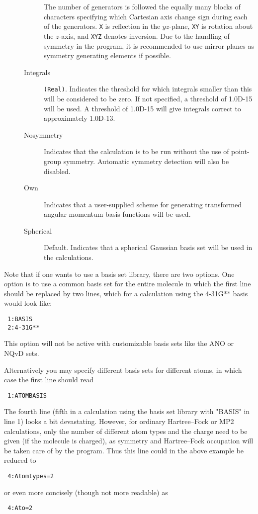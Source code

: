 \begin{description}
\begin{description}
The number of generators is followed the
equally many blocks of characters specifying which Cartesian axis
change sign during each of the generators. {\tt X}
is reflection
in the \mbox{$yz$-plane}, {\tt XY} is rotation about
the \mbox{$z$-axis},
and {\tt XYZ} denotes inversion. Due to the handling
of symmetry in
the program, it is recommended to use mirror planes as symmetry
generating elements if possible.
\item[Integrals] \verb|(Real)|. Indicates the threshold for which
  integrals smaller than this will be considered to be zero. If not
  specified, a threshold of 1.0D-15 will be used. A threshold
of 1.0D-15 will give integrals correct to approximately 1.0D-13.
\item[Nosymmetry] Indicates that the calculation is to be run without
  the use of point-group symmetry. Automatic symmetry detection will
  also be disabled.
\item[Own] Indicates that a user-supplied scheme for generating
  transformed angular momentum basis functions will be used.
\item[Spherical] Default. Indicates that a spherical Gaussian basis
  set will be used in the calculations.
\end{description}
\end{description}

Note that if one wants to use a basis set
library, there are two
options. One option is to use a common basis set for the entire
molecule in which the first line should be replaced by two lines,
which for a calculation using the 4-31G** basis would look like:
\begin{verbatim}
 1:BASIS
 2:4-31G**
\end{verbatim}
This option will not be active with customizable basis sets like the
ANO or NQvD sets.


Alternatively you may specify different basis sets for different
atoms, in which case the first line should read
\begin{verbatim}
 1:ATOMBASIS
\end{verbatim}

The fourth line (fifth in a calculation using the basis set library with "BASIS" in line 1)
looks a bit devastating. However, for ordinary
Hartree--Fock
or MP2 calculations, only the number of different atom types and the charge
need to be given (if the molecule is charged), as symmetry and
Hartree--Fock occupation
will be taken care of by the program. Thus
this line could in the above example be reduced to
\begin{verbatim}
 4:Atomtypes=2
\end{verbatim}
or even more concisely (though not more readable) as
\begin{verbatim}
 4:Ato=2
\end{verbatim}



